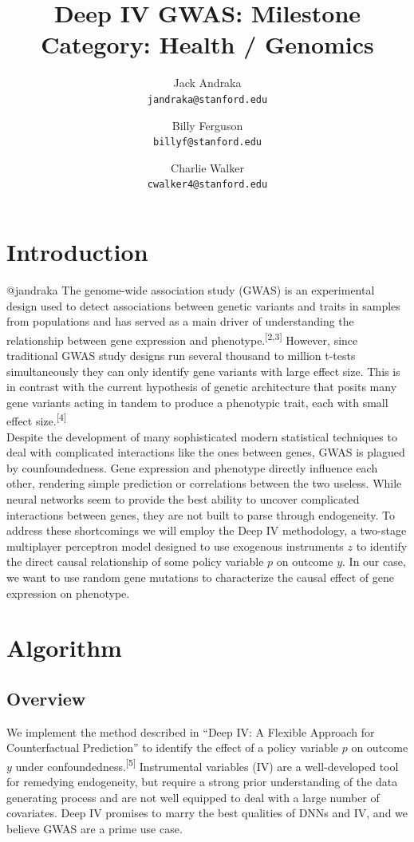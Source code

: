 \documentclass[11pt, oneside]{article}   	%
\title{Deep IV GWAS: Milestone \\
	\large Category: Health / Genomics}
\author{
	Jack Andraka\\ 
	\texttt{jandraka@stanford.edu}
	\and
	Billy Ferguson\\
	\texttt{billyf@stanford.edu}
	\and
	Charlie Walker\\
	\texttt{cwalker4@stanford.edu}
}
\date{}							%
\begin{document}
\maketitle
\section{Introduction}
@jandraka 
 The genome-wide association study (GWAS) is an experimental design used to detect associations between genetic variants and traits in samples from populations and has served as a main driver of understanding the relationship between gene expression and phenotype.\textsuperscript{[2,3]} However, since traditional GWAS study designs run several thousand to million t-tests simultaneously they can only identify gene variants with large effect size. This is in contrast with the current hypothesis of genetic architecture that posits many gene variants acting in tandem to produce a phenotypic trait, each with small effect size.\textsuperscript{[4]} \\
 
 Despite the development of many sophisticated modern statistical techniques to deal with complicated interactions like the ones between genes, GWAS is plagued by counfoundedness. Gene expression and phenotype directly influence each other, rendering simple prediction or correlations between the two useless. While neural networks seem to provide the best ability to uncover complicated interactions between genes, they are not built to parse through endogeneity.  To address these shortcomings we will employ the Deep IV methodology, a two-stage multiplayer perceptron model designed to use exogenous instruments $z$ to identify the direct causal relationship of some policy variable $p$ on outcome $y$. In our case, we want to use random gene mutations to characterize the causal effect of gene expression on phenotype.\\
 

\section{Algorithm}
\subsection{Overview}
We implement the method described in ``Deep IV: A Flexible Approach for Counterfactual Prediction'' to identify the effect of a policy variable $p$ on outcome $y$ under confoundedness.\textsuperscript{[5]} Instrumental variables (IV) are a well-developed tool for remedying endogeneity, but require a strong prior understanding of the data generating process and are not well equipped to deal with a large number of covariates. Deep IV promises to marry the best qualities of DNNs and IV, and we believe GWAS are a prime use case. \\
\end{document}
